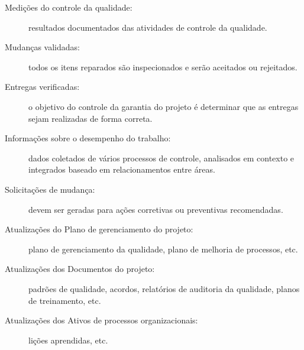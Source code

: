 \begin{description}
	
	\item[Medições do controle da qualidade:] resultados documentados das atividades de controle da qualidade.
	
	\item[Mudanças validadas:] todos os itens reparados são inspecionados e serão aceitados ou rejeitados.
	
	\item[Entregas verificadas:] o objetivo do controle da garantia do projeto é determinar que as entregas sejam realizadas de forma correta.
	
	\item[Informações sobre o desempenho do trabalho:] dados coletados de vários processos de controle, analisados em contexto e integrados baseado em relacionamentos entre áreas.
	
	\item[Solicitações de mudança:] devem ser geradas para ações corretivas ou preventivas recomendadas.
	
	\item[Atualizações do Plano de gerenciamento do projeto:] plano de gerenciamento da qualidade, plano de melhoria de processos, etc.
	
	\item[Atualizações dos Documentos do projeto:] padrões de qualidade, acordos, relatórios de auditoria da qualidade, planos de treinamento, etc.
	
	\item[Atualizações dos Ativos de processos organizacionais:] lições aprendidas, etc.
	
\end{description}